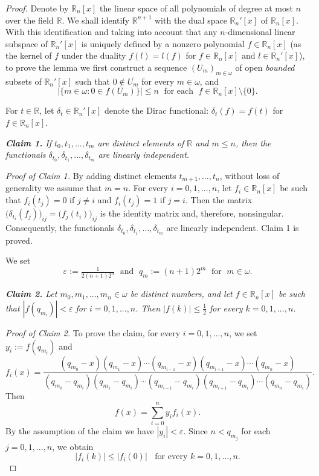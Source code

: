 \documentclass[10pt,a4paper]{amsart}
\newcommand{\IR}{\mathbb{R}}
\newcommand{\RR}{\mathbb{R}}
\newcommand{\e}{\varepsilon}
\newcommand{\w}{\omega}
\begin{document}
\begin{proof}
Denote by $\IR_n[x]$ the linear space of all polynomials of degree at most $n$ over the field $\IR$.
We shall identify $\IR^{n+1}$ with the dual space $\IR_n'[x]$ of $\IR_n[x]$. With this identification and taking into account that any $n$-dimensional linear subspace of $\IR_n'[x]$ is uniquely defined by a nonzero polynomial $f\in \IR_n[x]$ (as the kernel of $f$ under the duality $f(l)=l(f)$ for $f\in \IR_n[x]$ and $l\in \IR_n'[x]$), to prove the lemma we first construct a sequence $(U_m)_{m\in \w}$ of open {\em bounded} subsets of $\IR_n'[x]$ such that $0\not\in \overline{U_m}$ for every $m\in\w$, and
\begin{equation}\label{eq:lemRn+1}
|\{m\in\w: 0\in f(U_m) \}|\leq n \; \text{ for each }\; f\in \IR_n[x]\setminus \{0\}.
\end{equation}

For $t\in\IR$, let $\delta_t\in \IR_n'[x]$ denote the Dirac functional: $\delta_t(f)=f(t)$ for $f\in \RR_n[x]$.
\smallskip

{\em {\bf Claim 1.} If $t_0,t_1,...,t_m$ are distinct elements of $\IR$ and $m\leq n$, then the functionals $\delta_{t_0},\delta_{t_1},...,\delta_{t_m}$ are linearly independent.}
\smallskip

{\em Proof of Claim 1.} By adding distinct elements $t_{m+1},\dots,t_n$, without loss of generality we assume that $m=n$. For every $i=0,1,...,n$, let $f_i\in \IR_n[x]$ be such that $f_i(t_j)=0$ if $j\neq i$ and $f_i(t_j)=1$ if $j= i$. Then the matrix $\big(\delta_{t_i}(f_j)\big)_{ij}=\big(f_j(t_i)\big)_{ij}$ is the identity matrix and, therefore, nonsingular. Consequently, the functionals $\delta_{t_0},\delta_{t_1},...,\delta_{t_m}$ are linearly independent. Claim 1 is proved.
\smallskip

We set
\[
\e := \tfrac{1}{2(n+1)2^n} \; \text{ and } \; q_m := (n+1) 2^m \; \text{ for }\; m\in\w.
\]
\smallskip

{\em {\bf Claim 2.} Let $m_0,m_1,...,m_n\in\w$ be distinct numbers, and let $f\in \IR_n[x]$ be such that $|f(q_{m_i})|<\e$ for $i=0,1,...,n$.  Then $|f(k)|\leq \tfrac{1}{2}$ for every $k=0,1,...,n$.}
\smallskip

{\em Proof of Claim 2.} To prove the claim, for every $i=0,1,...,n$, we set $y_i:=f(q_{m_i})$ and
\[
f_i(x) =\frac
{(q_{m_0}-x)(q_{m_1}-x)\cdots(q_{m_{i-1}}-x)(q_{m_{i+1}}-x)\cdots(q_{m_{n}}-x)}
{(q_{m_0}-q_{m_i})(q_{m_1}-q_{m_i})\cdots(q_{m_{i-1}}-q_{m_i})(q_{m_{i+1}}-q_{m_i})\cdots(q_{m_{n}}-q_{m_i})}.
\]
%
Then
\[
f(x)=\sum_{i=0}^n y_i f_i(x).
\]
By the assumption of the claim we have $|y_i|<\e$. Since $n < q_{m_j}$ for each $j=0,1,...,n$, we obtain
\[
|f_i(k)|\leq |f_i(0)| \;\; \mbox{ for every $k=0,1,...,n$}.
\]



\end{proof}
\end{document}
